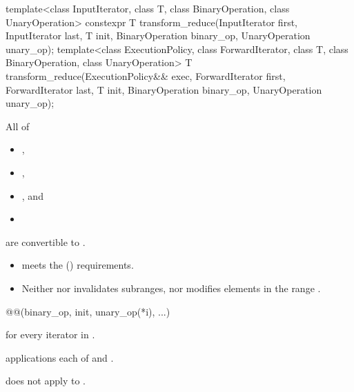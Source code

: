 %
\begin{itemdecl}
template<class InputIterator, class T,
         class BinaryOperation, class UnaryOperation>
  constexpr T transform_reduce(InputIterator first, InputIterator last, T init,
                               BinaryOperation binary_op, UnaryOperation unary_op);
template<class ExecutionPolicy,
         class ForwardIterator, class T,
         class BinaryOperation, class UnaryOperation>
  T transform_reduce(ExecutionPolicy&& exec,
                     ForwardIterator first, ForwardIterator last,
                     T init, BinaryOperation binary_op, UnaryOperation unary_op);
\end{itemdecl}

\begin{itemdescr}
\pnum
\mandates
  All of
  \begin{itemize}
  \item {},
  \item {},
  \item {}, and
  \item {}
  \end{itemize}
  are convertible to .

\pnum
\expects
\begin{itemize}
\item
   meets the  () requirements.
\item
  Neither  nor  invalidates subranges,
  nor modifies elements in the range .
\end{itemize}

\pnum
\returns
\begin{codeblock}
@@(binary_op, init, unary_op(*i), ...)
\end{codeblock}
for every iterator  in .

\pnum
\complexity
{} applications each of  and
.

\pnum
\begin{note}
 does not apply  to .
\end{note}
\end{itemdescr}

